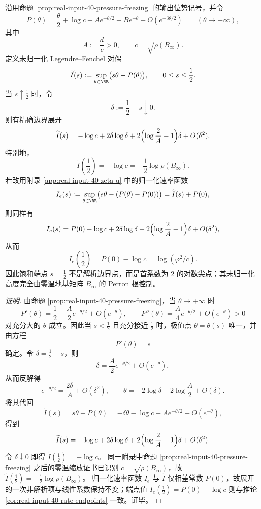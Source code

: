 \begin{conclusion}\label{con:xi-terminal-real-input-output-rate-log-cusp}
沿用命题 \ref{prop:real-input-40-pressure-freezing} 的输出位势记号，并令
\[
P(\theta)=\frac{\theta}{2}+\log c+A e^{-\theta/2}+B e^{-\theta}+O(e^{-3\theta/2})
\qquad (\theta\to+\infty),
\]
其中
\[
A:=\frac{d}{c}>0,
\qquad
c=\sqrt{\rho(B_\infty)}.
\]
定义未归一化 Legendre--Fenchel 对偶
\[
\widetilde I(s):=\sup_{\theta\in\RR}\bigl(s\theta-P(\theta)\bigr),
\qquad 0\le s\le \frac12.
\]
当 \(s\uparrow \frac12\) 时，令
\[
\delta:=\frac12-s\downarrow 0.
\]
则有精确边界展开
\[
\widetilde I(s)
=
-\log c
+2\delta\log\delta
+2\Bigl(\log\frac{2}{A}-1\Bigr)\delta
+O(\delta^2).
\]
特别地，
\[
\widetilde I\!\left(\frac12\right)
=-\log c
=-\frac12\log\rho(B_\infty).
\]
若改用附录 \ref{app:real-input-40-zeta-u} 中的归一化速率函数
\[
I_e(s):=\sup_{\theta\in\RR}\bigl(s\theta-(P(\theta)-P(0))\bigr)
=\widetilde I(s)+P(0),
\]
则同样有
\[
I_e(s)
=
P(0)-\log c
+2\delta\log\delta
+2\Bigl(\log\frac{2}{A}-1\Bigr)\delta
+O(\delta^2),
\]
从而
\[
I_e\!\left(\frac12\right)=P(0)-\log c=\log(\varphi^2/c).
\]
因此饱和端点 \(s=\frac12\) 不是解析边界点，而是首系数为 \(2\) 的对数尖点；其未归一化高度完全由零温地基矩阵 \(B_\infty\) 的 Perron 根控制。
\end{conclusion}
\begin{proof}[证明]
由命题 \ref{prop:real-input-40-pressure-freezing}，当 \(\theta\to+\infty\) 时
\[
P'(\theta)=\frac12-\frac{A}{2}e^{-\theta/2}+O(e^{-\theta}),
\qquad
P''(\theta)=\frac{A}{4}e^{-\theta/2}+O(e^{-\theta})>0
\]
对充分大的 \(\theta\) 成立。因此当 \(s<\frac12\) 且充分接近 \(\frac12\) 时，极值点 \(\theta=\theta(s)\) 唯一，并由方程
\[
P'(\theta)=s
\]
确定。令 \(\delta=\frac12-s\)，则
\[
\delta=\frac{A}{2}e^{-\theta/2}+O(e^{-\theta}),
\]
从而反解得
\[
e^{-\theta/2}=\frac{2\delta}{A}+O(\delta^2),
\qquad
\theta=-2\log\delta+2\log\frac{A}{2}+O(\delta).
\]
将其代回
\[
\widetilde I(s)=s\theta-P(\theta)
=-\delta\theta-\log c-Ae^{-\theta/2}+O(e^{-\theta}),
\]
得到
\[
\widetilde I(s)
=
-\log c
+2\delta\log\delta
+2\Bigl(\log\frac{2}{A}-1\Bigr)\delta
+O(\delta^2).
\]
令 \(\delta\downarrow 0\) 即得
\(
\widetilde I(\frac12)=-\log c
\)。
同一附录中命题 \ref{prop:real-input-40-pressure-freezing} 之后的零温缩放证书已识别 \(c=\sqrt{\rho(B_\infty)}\)，故
\(
\widetilde I(\frac12)=-\frac12\log\rho(B_\infty)
\)。
归一化速率函数 \(I_e\) 与 \(\widetilde I\) 仅相差常数 \(P(0)\)，故展开的一次非解析项与线性系数保持不变；端点值
\(
I_e(\frac12)=P(0)-\log c
\)
则与推论 \ref{cor:real-input-40-rate-endpoints} 一致。证毕。
\end{proof}

